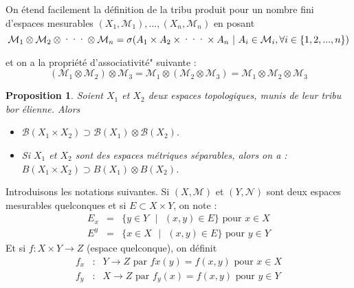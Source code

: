 \documentclass[3pt]{article}
\newtheorem{proposition}[theorem]{Proposition}
\begin{document}
\bigskip 

On \'{e}tend facilement la d\'{e}finition de la tribu produit pour un nombre
fini d'espaces mesurables $(X_{1},\mathcal{M}_{1}),...,(X_{n},\mathcal{M}%
_{n})$ en posant%
\begin{equation*}
\mathcal{M}_{1}\otimes \mathcal{M}_{2}\otimes \text{\textperiodcentered
\textperiodcentered \textperiodcentered }\otimes \mathcal{M}_{n}=\sigma
(A_{1}\times A_{2}\times \text{\textperiodcentered \textperiodcentered
\textperiodcentered }\times A_{n}\text{ }|\text{ }A_{i}\in \mathcal{M}%
_{i},\forall i\in \{1,2,...,n\})
\end{equation*}

et on a la propri\'{e}t\'{e} d'associativit\'{e}" suivante :%
\begin{equation*}
(\mathcal{M}_{1}\otimes \mathcal{M}_{2})\otimes \mathcal{M}_{3}=\mathcal{M}%
_{1}\otimes (\mathcal{M}_{2}\otimes \mathcal{M}_{3})=\mathcal{M}_{1}\otimes 
\mathcal{M}_{2}\otimes \mathcal{M}_{3}
\end{equation*}

\bigskip 

\begin{proposition}
Soient $X_{1}$ et $X_{2}$ deux espaces topologiques, munis de leur tribu bor%
\'{e}lienne. Alors 

\begin{itemize}
\item $\mathcal{B}(X_{1}\times X_{2})\supset \mathcal{B}(X_{1})\otimes 
\mathcal{B}(X_{2})$.

\item Si $X_{1}$ et $X_{2}$ sont des espaces m\'{e}triques s\'{e}parables,
alors on a :$B(X_{1}\times X_{2})\supset B(X_{1})\otimes B(X_{2})$.
\end{itemize}
\end{proposition}

\bigskip 

Introduisons les notations suivantes. Si $(X,\mathcal{M})$ et $(Y,\mathcal{N}%
)$ sont deux espaces mesurables quelconques et si $E\subset X\times Y$, on
note :%
\begin{eqnarray*}
E_{x} &=&\{y\in Y\text{ }|\text{ }(x,y)\in E\}\text{ pour }x\in X \\
E^{y} &=&\{x\in X\text{ }|\text{ }(x,y)\in E\}\text{ pour }y\in Y
\end{eqnarray*}%
Et si $f:X\times Y\rightarrow Z$ (espace quelconque), on d\'{e}finit 
\begin{eqnarray*}
f_{x} &:&Y\rightarrow Z\text{ par }fx(y)=f(x,y)\text{ pour }x\in X \\
f_{y} &:&X\rightarrow Z\text{ par }f_{y}(x)=f(x,y)\text{ pour }y\in Y
\end{eqnarray*}
\end{document}
